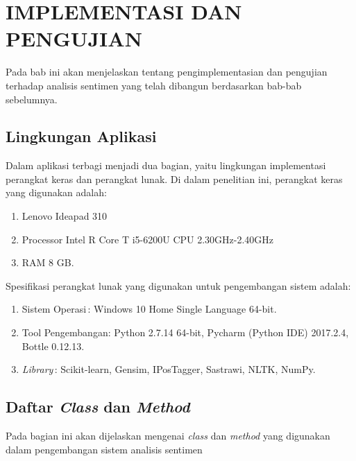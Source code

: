 \chapter{IMPLEMENTASI DAN PENGUJIAN}

%

\vspace{4.5pt}
Pada bab ini akan menjelaskan tentang pengimplementasian dan pengujian terhadap analisis sentimen yang telah dibangun berdasarkan bab-bab sebelumnya.
\section{Lingkungan Aplikasi}
Dalam aplikasi terbagi menjadi dua bagian, yaitu lingkungan implementasi perangkat keras dan perangkat lunak. Di dalam penelitian ini, perangkat keras yang digunakan adalah:
\begin{enumerate}[leftmargin=*]
	\item Lenovo Ideapad 310
	\item Processor Intel R Core T i5-6200U CPU 2.30GHz-2.40GHz
	\item RAM 8 GB.
\end{enumerate}

Spesifikasi perangkat lunak yang digunakan untuk pengembangan sistem adalah:
\begin{enumerate}[leftmargin=*]
	\item Sistem Operasi\quad\quad\quad\,: Windows 10 Home Single Language 	64-bit.
	\item Tool Pengembangan\quad: Python 2.7.14 64-bit, Pycharm (Python IDE) 2017.2.4, Bottle 0.12.13.
	\item \textit{Library}\quad\quad\quad\quad\quad\quad\,: Scikit-learn, Gensim, IPosTagger,	Sastrawi, NLTK, NumPy.
\end{enumerate}

\section{Daftar \textit{Class} dan \textit{Method}}
Pada bagian ini akan dijelaskan mengenai \textit{class} dan \textit{method} yang digunakan dalam pengembangan sistem analisis sentimen
